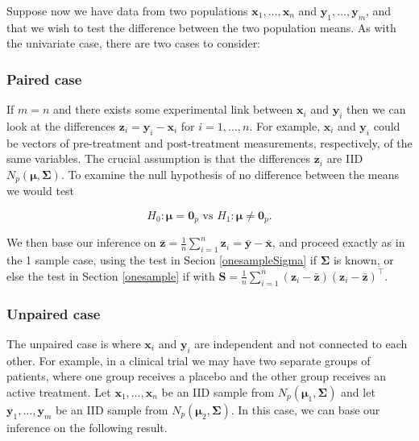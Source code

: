 \documentclass[]{book}
\theoremstyle{definition}
\theoremstyle{definition}
\theoremstyle{definition}
\theoremstyle{remark}
\begin{document}
Suppose now we have data from two populations \(\boldsymbol x_1, \ldots, \boldsymbol x_n\) and \(\boldsymbol y_1,\ldots, \boldsymbol y_m\), and that we wish to test the difference between the two population means. As with the univariate case, there are two cases to consider:

\hypertarget{paired-case}{%
\subsubsection*{Paired case}\label{paired-case}}

If \(m=n\) and there exists some experimental link between \(\boldsymbol x_i\) and \(\boldsymbol y_i\) then we can look at the differences \(\boldsymbol z_i = \boldsymbol y_i - \boldsymbol x_i\) for \(i=1,\ldots,n\). For example, \(\boldsymbol x_i\) and \(\boldsymbol y_i\) could be vectors of pre-treatment and post-treatment measurements, respectively, of the same variables. The crucial assumption is that the differences \(\boldsymbol z_i\) are IID \(N_p(\boldsymbol \mu, \boldsymbol \Sigma)\). To examine the null hypothesis of no difference between the means we would test

\[H_0: \boldsymbol \mu={\mathbf 0}_p \mbox{ vs } H_1: \boldsymbol \mu\neq {\mathbf 0}_p.\]

We then base our inference on \(\bar{\boldsymbol z} = \frac{1}{n} \sum_{i=1}^n \boldsymbol z_i = \bar{\boldsymbol y} - \bar{\boldsymbol x}\), and proceed exactly as in the 1 sample case, using the test in Secion \ref{onesampleSigma} if \(\boldsymbol \Sigma\) is known, or else the test in Section \ref{onesample} if with \(\boldsymbol S= \frac{1}{n} \sum_{i=1}^n (\boldsymbol z_i - \bar{\boldsymbol z})(\boldsymbol z_i - \bar{\boldsymbol z})^\top\).

\hypertarget{unpaired-case}{%
\subsubsection*{Unpaired case}\label{unpaired-case}}

The unpaired case is where \(\boldsymbol x_i\) and \(\boldsymbol y_i\) are independent and not connected to each other. For example, in a clinical trial we may have two separate groups of patients, where one group receives a placebo and the other group receives an active treatment. Let \(\boldsymbol x_1,\ldots,\boldsymbol x_n\) be an IID sample from \(N_p(\boldsymbol \mu_1,\boldsymbol \Sigma)\) and let \(\boldsymbol y_1,\ldots,\boldsymbol y_m\) be an IID sample from \(N_p(\boldsymbol \mu_2,\boldsymbol \Sigma)\). In this case, we can base our inference on the following result.
\end{document}
